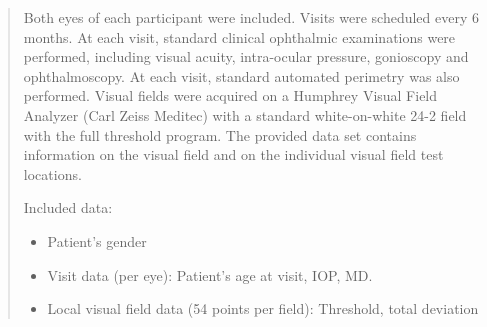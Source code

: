 \begin{quotation}
Both eyes of each participant were included. Visits were scheduled every 6 months. At each visit, standard clinical ophthalmic examinations were performed, including visual acuity, intra-ocular pressure, gonioscopy and ophthalmoscopy. At each visit, standard automated perimetry was also performed. Visual fields were acquired on a Humphrey Visual Field Analyzer (Carl Zeiss Meditec) with a standard white-on-white 24-2 field with the full threshold program. The provided data set contains information on the visual field and on the individual visual field test locations.

Included data:

\begin{itemize}
\item Patient's gender
\item Visit data (per eye): Patient's age at visit, IOP, MD.
\item Local visual field data (54 points per field): Threshold, total deviation
\end{itemize}

\end{quotation}

